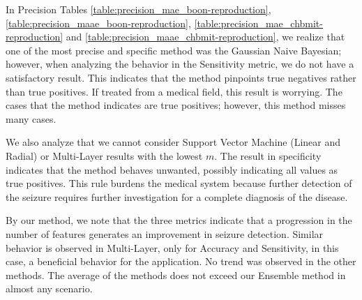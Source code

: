 In Precision Tables \ref{table:precision_mae_boon-reproduction}, \ref{table:precision_maae_boon-reproduction}, \ref{table:precision_mae_chbmit-reproduction} and \ref{table:precision_maae_chbmit-reproduction}, we realize that one of the most precise and specific method was the Gaussian Naive Bayesian; however, when analyzing the behavior in the Sensitivity metric, we do not have a satisfactory result. This indicates that the method pinpoints true negatives rather than true positives. If treated from a medical field, this result is worrying. The cases that the method indicates are true positives; however, this method misses many cases.

We also analyze that we cannot consider Support Vector Machine (Linear and Radial) or Multi-Layer results with the lowest $m$. The result in specificity indicates that the method behaves unwanted, possibly indicating all values as true positives. This rule burdens the medical system because further detection of the seizure requires further investigation for a complete diagnosis of the disease.

By our method, we note that the three metrics indicate that a progression in the number of features generates an improvement in seizure detection. Similar behavior is observed in Multi-Layer, only for Accuracy and Sensitivity, in this case, a beneficial behavior for the application. No trend was observed in the other methods. The average of the methods does not exceed our Ensemble method in almost any scenario. 


